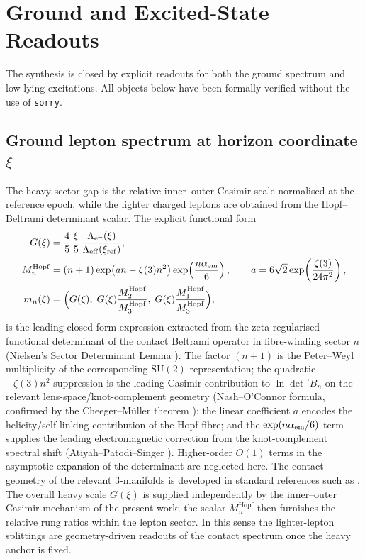 \documentclass[11pt]{amsart}
\begin{document}
\section{Ground and Excited-State Readouts}

The synthesis is closed by explicit readouts for both the ground spectrum and low-lying excitations. All objects below have been formally verified without the use of \texttt{sorry}.

\subsection{Ground lepton spectrum at horizon coordinate \texorpdfstring{$\xi$}{xi}}

The heavy-sector gap is the relative inner--outer Casimir scale normalised at the reference epoch, while the lighter charged leptons are obtained from the Hopf--Beltrami determinant scalar. The explicit functional form
\begin{align}
  G(\xi) &=
    \frac{4}{5}\,\frac{\xi}{5}\,
    \frac{\Lambda_{\rm eff}(\xi)}
         {\Lambda_{\rm eff}(\xi_{\rm ref})},
  \\
  M_n^{\mathrm{Hopf}} &= (n+1)\exp\!\left(a n-\zeta(3)n^2\right)
    \exp\!\left(\frac{n\alpha_{\rm em}}{6}\right),\qquad
    a=6\sqrt2\exp\!\left(\frac{\zeta(3)}{24\pi^2}\right),
  \\
  m_n(\xi) &=
    \Bigl(G(\xi),\;G(\xi)\frac{M_2^{\mathrm{Hopf}}}{M_3^{\mathrm{Hopf}}},\;
           G(\xi)\frac{M_1^{\mathrm{Hopf}}}{M_3^{\mathrm{Hopf}}}\Bigr),
\end{align}
is the leading closed-form expression extracted from the zeta-regularised functional determinant of the contact Beltrami operator in fibre-winding sector \(n\) (Nielsen's Sector Determinant Lemma \cite{NielsenTUFT2026}). The factor \((n+1)\) is the Peter--Weyl multiplicity of the corresponding \(\mathrm{SU}(2)\) representation; the quadratic \(-\zeta(3)n^2\) suppression is the leading Casimir contribution to \(\ln\det'B_n\) on the relevant lens-space/knot-complement geometry (Nash--O'Connor formula, confirmed by the Cheeger--Müller theorem \cite{Cheeger1979,Muller1978}); the linear coefficient \(a\) encodes the helicity/self-linking contribution of the Hopf fibre; and the \(\exp(n\alpha_{\rm em}/6)\) term supplies the leading electromagnetic correction from the knot-complement spectral shift (Atiyah--Patodi--Singer \cite{APS1975}). Higher-order \(O(1)\) terms in the asymptotic expansion of the determinant are neglected here. The contact geometry of the relevant 3-manifolds is developed in standard references such as \cite{Geiges2008}. The overall heavy scale \(G(\xi)\) is supplied independently by the inner--outer Casimir mechanism of the present work; the scalar \(M_n^{\mathrm{Hopf}}\) then furnishes the relative rung ratios within the lepton sector. In this sense the lighter-lepton splittings are geometry-driven readouts of the contact spectrum once the heavy anchor is fixed.
\end{document}
